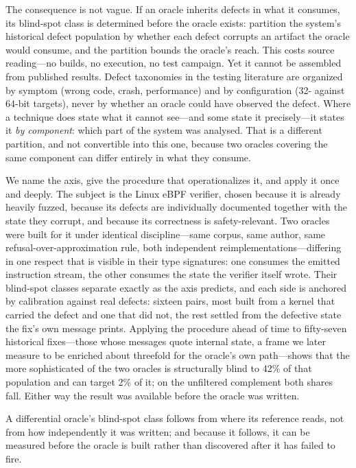 The consequence is not vague. If an oracle inherits defects in what it consumes,
its blind-spot class is determined before the oracle exists: partition the system's
historical defect population by whether each defect corrupts an artifact the oracle
would consume, and the partition bounds the oracle's reach. This costs source
reading---no builds, no execution, no test campaign. Yet it cannot be assembled from
published results. Defect taxonomies in the testing literature are organized by
symptom (wrong code, crash, performance) and by configuration (32- against 64-bit
targets), never by whether an oracle could have observed the defect. Where a technique
does state what it cannot see---and some state it precisely---it states it \emph{by
component}: which part of the system was analysed. That is a different partition, and
not convertible into this one, because two oracles covering the same component can
differ entirely in what they consume.

We name the axis, give the procedure that operationalizes it, and apply it once and
deeply. The subject is the Linux eBPF verifier, chosen because it is already heavily
fuzzed, because its defects are individually documented together with the state they
corrupt, and because its correctness is safety-relevant. Two oracles were built for
it under identical discipline---same corpus, same author, same
refusal-over-approximation rule, both independent reimplementations---differing in
one respect that is visible in their type signatures: one consumes the emitted
instruction stream, the other consumes the state the verifier itself wrote. Their
blind-spot classes separate exactly as the axis predicts, and each side is anchored
by calibration against real defects: sixteen pairs, most built from a kernel that
carried the defect and one that did not, the rest settled from the defective state the
fix's own message prints. Applying the procedure ahead of time to
fifty-seven historical fixes---those whose messages quote internal state, a frame we
later measure to be enriched about threefold for the oracle's own path---shows that
the more sophisticated of the two oracles is structurally blind to 42\% of that
population and can target 2\% of it; on the unfiltered complement both shares fall.
Either way the result was available before the oracle was written.

A differential oracle's blind-spot class follows from where its reference reads, not
from how independently it was written; and because it follows, it can be measured
before the oracle is built rather than discovered after it has failed to fire.
